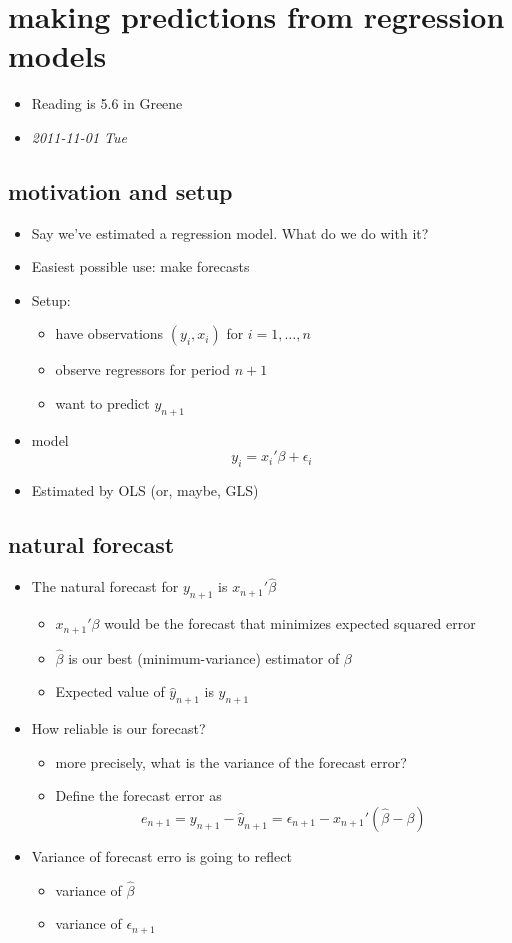 \section{making predictions from regression models}
\label{sec-4}

\begin{itemize}
\item Reading is 5.6 in Greene
\item \textit{2011-11-01 Tue}
\end{itemize}
\subsection{motivation and setup}
\label{sec-4-1}

\begin{itemize}
\item Say we've estimated a regression model.  What do we do with it?
\item Easiest possible use: make forecasts
\item Setup:
\begin{itemize}
\item have observations $(y_i, x_i)$ for $i = 1,\dots,n$
\item observe regressors for period $n+1$
\item want to predict $y_{n+1}$
\end{itemize}
\item model
       \[ y_i  = x_i'\beta + \epsilon_i \]
\item Estimated by OLS (or, maybe, GLS)
\end{itemize}
\subsection{natural forecast}
\label{sec-4-2}

\begin{itemize}
\item The natural forecast for $y_{n+1}$ is $x_{n+1}'\hat\beta$
\begin{itemize}
\item $x_{n+1}'\beta$ would be the forecast that minimizes expected
         squared error
\item $\hat\beta$ is our best (minimum-variance) estimator of $\beta$
\item Expected value of $\hat y_{n+1}$ is $y_{n+1}$
\end{itemize}
\item How reliable is our forecast?
\begin{itemize}
\item more precisely, what is the variance of the forecast error?
\item Define the forecast error as 
         \[ e_{n+1} = y_{n+1} - \hat y_{n+1} = \epsilon_{n+1} -
         x_{n+1}'(\hat\beta - \beta) \]
\end{itemize}
\item Variance of forecast erro is going to reflect
\begin{itemize}
\item variance of $\hat\beta$
\item variance of $\epsilon_{n+1}$
\end{itemize}
\end{itemize}
